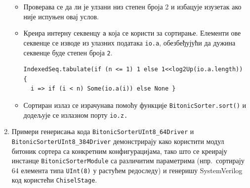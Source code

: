 \documentclass[12pt, a4paper]{article}
\theoremstyle{definition}
\begin{document}
\begin{enumerate}
\begin{itemize}
 \item Проверава се да ли је улзани низ степен броја 2 и избацује изузетак ако није испуњен овај услов.
 \item Креира интерну секвенцу \verb+a+ која се користи за сортирање. Елементи ове секвенце се изводе из улазних података \verb+io.a+, обезбеђујући да дужина секвенце буде степен броја \verb+2+.
 \begin{verbatim}
IndexedSeq.tabulate(if (n <= 1) 1 else 1<<log2Up(io.a.length)) {
  i => if (i < n) Some(io.a(i)) else None }
\end{verbatim}
 \item Сортиран излаз се израчунава помоћу функције \verb+BitonicSorter.sort()+ и додељује се излазном порту \verb+io.z.+
\end{itemize}

\item Примери генерисања кода \verb+BitonicSorterUInt8_64Driver+ и \verb+BitonicSorterUInt8_384Driver+ демонстрирају како користити модул битоник сортера са конкретним конфигурацијама, тако што се креирају инстанце \verb+BitonicSorterModule+ са различитим параметрима (нпр.\ сортирају 64 елемента типа \verb+UInt(8)+ у растућем редоследу) и генеришу SystemVerilog код користећи \verb+ChiselStage+.

\end{enumerate}

\newpage
\end{document}
